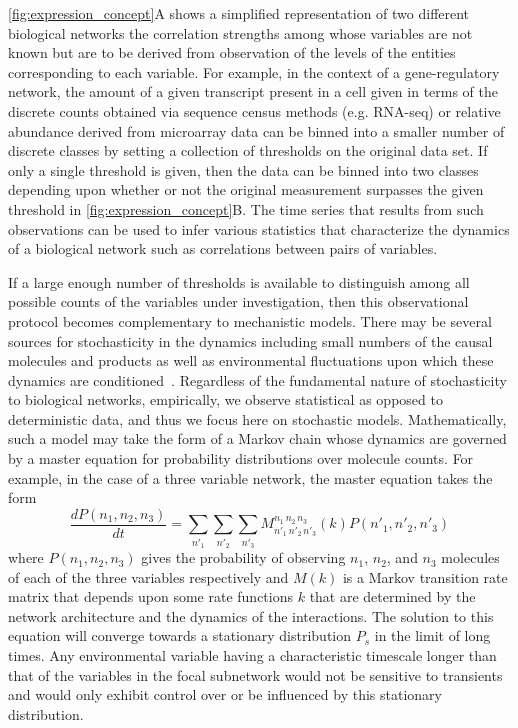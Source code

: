 \ref{fig:expression_concept}A shows a simplified representation of two different biological networks the correlation strengths among whose variables are not known but are to be derived from observation of the levels of the entities corresponding to each variable. For example, in the context of a gene-regulatory network, the amount of a given transcript present in a cell given in terms of the discrete counts obtained via sequence census methods (e.g. RNA-seq) or relative abundance derived from microarray data can be binned into a smaller number of discrete classes by setting a collection of thresholds on the original data set. If only a single threshold is given, then the data can be binned into two classes depending upon whether or not the original measurement surpasses the given threshold in \ref{fig:expression_concept}B.
The time series that results from such observations can be used to infer various statistics that characterize the dynamics of a biological network such as correlations between pairs of variables.

If a large enough number of thresholds is available to distinguish among all possible counts of the variables under investigation, then this observational protocol becomes complementary to mechanistic models.  There may be several sources for stochasticity in the dynamics including small numbers of the causal molecules and products as well as environmental fluctuations upon which these dynamics are conditioned~\cite{Swain2002,Paulsson2004,Thattai2004,Acar2008a,Lestas2010,Munsky2012,Chalancon2012,Neuert2013,Sanchez2013}. Regardless of the fundamental nature of stochasticity to biological networks, empirically, we observe statistical as opposed to deterministic data, and thus we focus here on stochastic models.
Mathematically, such a model may take the form of a Markov chain whose dynamics are governed by a master equation for probability distributions over molecule counts. For example, in the case of a three variable network, the master equation takes the form
$$
\frac{dP(n_1,n_2,n_3)}{dt} = \sum_{n'_1}\sum_{n'_2}\sum_{n'_3} M^{n_1\,n_2\,n_3}_{n'_1\,n'_2\,n'_3}(k) P(n'_1,n'_2,n'_3)
$$
where $P(n_1,n_2,n_3)$ gives the probability of observing $n_1$, $n_2$, and $n_3$ molecules of each of the three variables respectively and $M(k)$ is a Markov transition rate matrix that depends upon some rate functions $k$ that are determined by the network architecture and the dynamics of the interactions.  The solution to this equation will converge towards a stationary distribution $P_s$ in the limit of long times. Any environmental variable having a characteristic timescale longer than that of the variables in the focal subnetwork would not be sensitive to transients and would only exhibit control over or be influenced by this stationary distribution.

